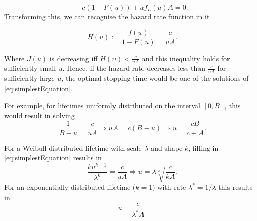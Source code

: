 \begin{equation}
-c(1-F(u))+uf_L(u)A=0.
\end{equation}
Transforming this, we can recognise the hazard rate function in it

\begin{equation}\label{eq:simplestEquation}
H(u):=\frac{f(u)}{1-F(u)}=\frac{c}{uA}.
\end{equation}

Where $J(u)$ is decreasing iff $H(u)<\frac{c}{uA}$ and this inequality holds for sufficiently small $u$.
Hence, if the hazard rate decreases less than $\frac{c}{uA}$ for sufficiently large $u$, the optimal stopping time would be one of the solutions of \eqref{eq:simplestEquation}.
\begin{example}
For example, for lifetimes uniformly distributed on the interval $[0,B]$, this would result in solving
$$
\frac{1}{B-u}=\frac{c}{u A}\Rightarrow u A = c(B-u) \Rightarrow u = \frac{cB}{c+A}.
$$
\end{example}

\begin{example}

For a Weibull distributed lifetime with scale $\lambda$ and shape $k$, filling in \eqref{eq:simplestEquation} results in\\
$$
\frac{ku^{k-1}}{\lambda^k}=\frac{c}{u A}\Rightarrow u=\lambda\sqrt[k]{\frac{c}{kA}}.
$$
For an exponentially distributed lifetime ($k=1$) with rate $\lambda^*=1/\lambda$ this results in
$$
u=\frac{c}{\lambda^* A}.
$$
\end{example}

